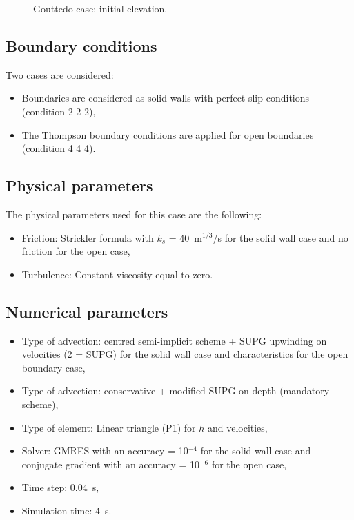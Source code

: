 \begin{figure}[H]
\begin{center}
\end{center}
\caption{Gouttedo case: initial elevation.}
\label{fig:gouttedo_init}
\end{figure}

\subsection{Boundary conditions}

Two cases are considered:
\begin{itemize}
\item Boundaries are considered as solid walls with perfect slip conditions
  (condition 2 2 2),
\item The Thompson boundary conditions are applied for open boundaries
  (condition 4 4 4).
\end{itemize}

\subsection{Physical parameters}

The physical parameters used for this case are the following:
\begin{itemize}
\item Friction: Strickler formula with $k_s$ = 40~m$^{1/3}$/s for the solid wall
  case and no friction for the open case,
\item Turbulence: Constant viscosity equal to zero.
\end{itemize}

\subsection{Numerical parameters}
\begin{itemize}
\item Type of advection: centred semi-implicit scheme + SUPG upwinding on
  velocities (2 = SUPG) for the solid wall case and characteristics for
  the open boundary case,
\item Type of advection: conservative + modified SUPG on depth (mandatory
  scheme),
\item  Type of element: Linear triangle (P1) for $h$ and velocities,
\item Solver: GMRES with an accuracy =  10$^{-4}$ for the solid wall case
  and conjugate gradient with an accuracy =  10$^{-6}$ for the open case,
\item Time step: 0.04~s,
\item Simulation time: 4~s.
\end{itemize}

